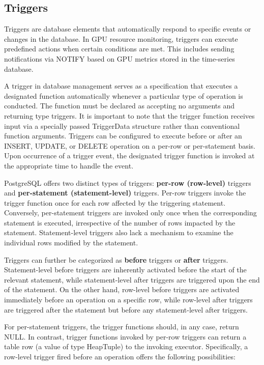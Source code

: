 \subsection{Triggers}

Triggers \cite{Shaik2023triggers, postgresql-doc} are database elements that automatically respond to specific events or changes in the database. In GPU resource monitoring, triggers can execute predefined actions when certain conditions are met. This includes sending notifications via NOTIFY based on GPU metrics stored in the time-series database.

A trigger in database management serves as a specification that executes a designated function automatically whenever a particular type of operation is conducted. The function must be declared as accepting no arguments and returning type triggers. It is important to note that the trigger function receives input via a specially passed TriggerData structure rather than conventional function arguments. Triggers can be configured to execute before or after an INSERT, UPDATE, or DELETE operation on a per-row or per-statement basis. Upon occurrence of a trigger event, the designated trigger function is invoked at the appropriate time to handle the event.

PostgreSQL offers two distinct types of triggers: \textbf{per-row (row-level)} triggers and \textbf{per-statement (statement-level)} triggers. Per-row triggers invoke the trigger function once for each row affected by the triggering statement. Conversely, per-statement triggers are invoked only once when the corresponding statement is executed, irrespective of the number of rows impacted by the statement. Statement-level triggers also lack a mechanism to examine the individual rows modified by the statement.

Triggers can further be categorized as \textbf{before} triggers or \textbf{after} triggers. Statement-level before triggers are inherently activated before the start of the relevant statement, while statement-level after triggers are triggered upon the end of the statement. On the other hand, row-level before triggers are activated immediately before an operation on a specific row, while row-level after triggers are triggered after the statement but before any statement-level after triggers.

For per-statement triggers, the trigger functions should, in any case, return NULL. In contrast, trigger functions invoked by per-row triggers can return a table row (a value of type HeapTuple) to the invoking executor. Specifically, a row-level trigger fired before an operation offers the following possibilities:

